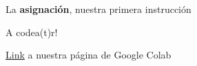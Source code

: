 \documentclass{beamer}
\begin{document}
\begin{frame}{La \textbf{asignación}, nuestra primera instrucción}
    
\end{frame}



\begin{frame}{A codea(t)r!}
\begin{block}

\textcolor{blue}{\href{https://colab.research.google.com/drive/1pssmr5FRjDoYxt3-iadaxa-ek3ZmFwPx?usp=sharing}{Link}} a nuestra página de Google Colab	
	
\end{block}
\end{frame}



%
%
%
%
%
\end{document}
